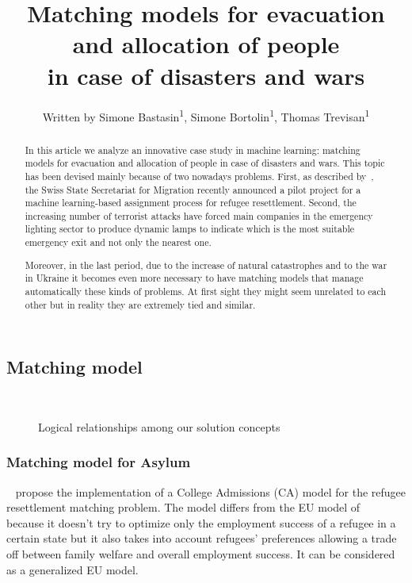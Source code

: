 \documentclass[letterpaper]{article} %
\title{Matching models for evacuation and allocation of people\\in case of disasters and wars}
\author{
    Written by Simone Bastasin\textsuperscript{\rm 1}, Simone Bortolin\textsuperscript{\rm 1}, Thomas Trevisan\textsuperscript{\rm 1}
    \\
}
\begin{document}
    \maketitle

    \begin{abstract}
        In this article we analyze an innovative case study in machine learning: matching models for evacuation and allocation of people in case of disasters and wars. This topic has been devised mainly because of two nowadays problems. First, as described by~\citet{olbergml}, the Swiss State Secretariat for Migration recently announced a pilot project for a machine learning-based assignment process for refugee resettlement. Second, the increasing number of terrorist attacks have forced main companies in the emergency lighting sector to produce dynamic lamps to indicate which is the most suitable emergency exit and not only the nearest one.

        Moreover, in the last period, due to the increase of natural catastrophes and to the war in Ukraine it becomes even more necessary to have matching models that manage automatically  these kinds of problems. At first sight they might seem unrelated to each other but in reality they are extremely tied and similar.
    \end{abstract}

    \subsection{Matching model}\label{matching-model}%
    ~\citet{olbergml,basshuysen,delacretaz_2020}


    \begin{figure}[!htb]
        \def\svgwidth{\columnwidth}
        
        \caption{Logical relationships among our solution concepts}
        \label{fig:matching}
    \end{figure}

    \subsubsection{Matching model for Asylum}\label{matching-model-for-asylum}%
    ~\citet{olbergml,basshuysen,delacretaz_2020,fernandez} propose the implementation of a College Admissions (CA) model for the refugee resettlement matching problem.
    The model differs from the EU model of~\citet{basshuysen} because it doesn't try to optimize only the employment success of a refugee in a certain state but it also takes into account refugees' preferences allowing a trade off between family welfare and overall employment success.
    It can be considered as a generalized EU model.
\end{document}
